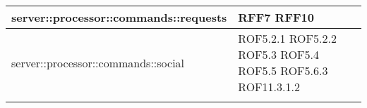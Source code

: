 \begin{center}
\begin{longtable}{| p{9cm} | p{4cm} |}
\hline
server::processor::commands::requests  & RFF7 \newline RFF10 \newline \\
\hline
server::processor::commands::social  &   ROF5.2.1 \newline ROF5.2.2 \newline ROF5.3 \newline ROF5.4 \newline ROF5.5 \newline ROF5.6.3 \newline ROF11.3.1.2 \newline \\
\hline \\
\end{longtable}
\egroup
\end{center}
